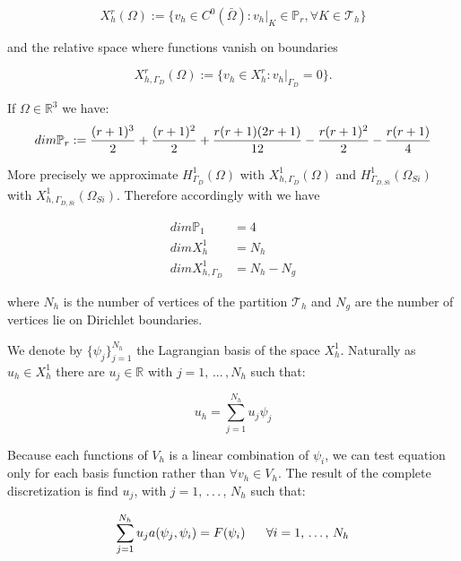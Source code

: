 \begin{equation}
X^r_h(\Omega) := \{v_h \in C^0(\bar{\Omega}): v_h|_K\in \mathbb{P}_r,\forall K \in \mathcal{T}_h \}
\end{equation}

and the relative space where functions vanish on boundaries

\begin{equation}
X^r_{h,\Gamma_D}(\Omega)  := \{ v_h \in X^r_h: v_h|_{\Gamma_D} = 0 \} .
\end{equation}

If $\Omega \in \mathbb{R}^3$ we have:
\begin{equation}
\small
\label{eq: dimensione polinomi}
dim\mathbb{P}_r := \dfrac{(r+1)^3}{2} + \dfrac{(r+1)^2}{2} + \dfrac{r(r+1)(2r+1)}{12} - \dfrac{r(r+1)^2}{2} - \dfrac{r(r+1)}{4}
\end{equation}

More precisely we approximate $H^1_{\Gamma_D}(\Omega)$ with $X^1_{h,\Gamma_D}(\Omega)$ and $H^1_{\Gamma_{D,Si}}(\Omega_{Si})$ with $X^1_{h,\Gamma_{D,Si}}(\Omega_{Si})$. Therefore accordingly with  we have

\begin{align*}
dim \mathbb{P}_1 & = 4 \\
dim X^1_h & = N_h \\
dim X^1_{h,\Gamma_D} & = N_h - N_g
\end{align*}

where $N_h$ is the number of vertices of the partition $\mathcal{T}_h$ and $N_g$ are the number of vertices lie on Dirichlet boundaries.

We denote by $\{ \psi_j \}_{j=1}^{N_h} $ the Lagrangian basis of the space $X^1_{h}$. Naturally  as $u_h \in X^1_{h}$ there are $u_j \in \mathbb{R}$ with $j=1,\, ... \,, N_h$ such that:


\begin{equation}
u_h = \sum_{j=1}^{N_h} u_j \psi_j
\end{equation}

Because each functions of $V_h$ is a linear combination of $\psi_i$, we can test equation  only for each basis function rather than $\forall v_h \in V_h$. The result of the complete discretization is find $u_j$, with $j = 1, \, . \, . \, . \, , \, N_h$ such that:

\begin{equation}
\sum_{j=1}^{N_h}u_ja(\psi_j,\psi_i) = F(\psi_i) \psp{10} \forall i = 1, \, . \, . \, . \, , \, N_h
\end{equation}

